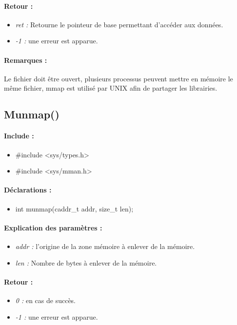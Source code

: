 \documentclass{article}[12pt]
\begin{document}
\paragraph{Retour : }
\begin{itemize}
	\item \emph{ret : } Retourne le pointeur de base permettant d'accéder aux données.
	\item \emph{-1 : } une erreur est apparue.
\end{itemize}
\paragraph{Remarques : }
Le fichier doit être ouvert, plusieurs processus peuvent mettre en mémoire le même fichier, mmap est utilisé par UNIX afin de partager les librairies.
\subsection{Munmap()}
\paragraph{Include : }
\begin{itemize}
	\item \#include <sys/types.h>
	\item \#include <sys/mman.h>
\end{itemize}
\paragraph{Déclarations : }
\begin{itemize}
	\item int munmap(caddr\_t addr, size\_t len);
\end{itemize}
\paragraph{Explication des paramètres : }
\begin{itemize}
	\item \emph{addr : } l'origine de la zone mémoire à enlever de la mémoire.
	\item \emph{len : } Nombre de bytes à enlever de la mémoire.
\end{itemize}
\paragraph{Retour : }
\begin{itemize}
	\item \emph{0 : } en cas de succès.
	\item \emph{-1 : } une erreur est apparue.
\end{itemize}
\end{document}
